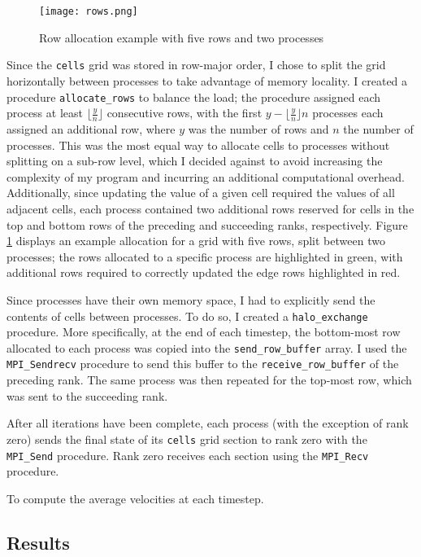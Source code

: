 \documentclass[twocolumn, a4paper]{article}
\begin{document}
\begin{figure}[htbp]
  \centering
  \texttt{[image: rows.png]}
  \caption{Row allocation example with five rows and two processes}\label{fig:rows}
\end{figure}

Since the \texttt{cells} grid was stored in row-major order, I chose to split the grid horizontally between processes to take advantage of memory locality.
I created a procedure \texttt{allocate\_rows} to balance the load; the procedure assigned each process at least $\lfloor\frac{y}{n}\rfloor$ consecutive rows, with the first $y - \lfloor\frac{y}{n}\rfloor n$ processes each assigned an additional row, where $y$ was the number of rows and $n$ the number of processes.
This was the most equal way to allocate cells to processes without splitting on a sub-row level, which I decided against to avoid increasing the complexity of my program and incurring an additional computational overhead.
Additionally, since updating the value of a given cell required the values of all adjacent cells, each process contained two additional rows reserved for cells in the top and bottom rows of the preceding and succeeding ranks, respectively.
Figure \ref{fig:rows} displays an example allocation for a grid with five rows, split between two processes; the rows allocated to a specific process are highlighted in green, with additional rows required to correctly updated the edge rows highlighted in red.

Since processes have their own memory space, I had to explicitly send the contents of cells between processes.
To do so, I created a \texttt{halo\_exchange} procedure.
More specifically, at the end of each timestep, the bottom-most row allocated to each process was copied into the \texttt{send\_row\_buffer} array.
I used the \texttt{MPI\_Sendrecv} procedure to send this buffer to the \texttt{receive\_row\_buffer} of the preceding rank.
The same process was then repeated for the top-most row, which was sent to the succeeding rank.

After all iterations have been complete, each process (with the exception of rank zero) sends the final state of its \texttt{cells} grid section to rank zero with the \texttt{MPI\_Send} procedure.
Rank zero receives each section using the \texttt{MPI\_Recv} procedure.

To compute the average velocities at each timestep.

\subsection{Results}
\end{document}
